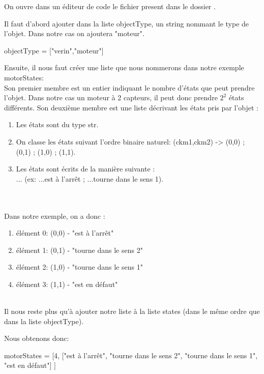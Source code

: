 \documentclass[12pt]{report}    %
\begin{document}
On ouvre dans un éditeur de code le fichier  present dans le dossier .


Il faut d'abord ajouter dans la liste objectType, un string nommant le type de l'objet. Dans notre cas on ajoutera "moteur". 
\begin{pyCode}
        objectType = ["verin","moteur"]
\end{pyCode}


Ensuite, il nous faut créer une liste que nous nommerons dans notre exemple motorStates:\\

Son premier membre est un entier indiquant le nombre d'états que peut prendre l'objet. Dans notre cas un moteur à 2 capteurs, il peut donc prendre $ 2^2 $ états différents.
Son deuxième membre est une liste décrivant les états pris par l'objet :

\begin{enumerate}
    \item Les états sont du type str.
    \item On classe les états suivant l'ordre binaire naturel: (ckm1,ckm2) -> (0,0) ; (0,1) ; (1,0) ; (1,1).
    \item Les états sont écrits de la manière suivante : \\
     ... (ex: ...est à l'arrêt ; ...tourne dans le sens 1).
\end{enumerate}\\ \\

Dans notre exemple, on a donc : 

\begin{enumerate}
    \item élément 0: (0,0) - "est à l'arrêt"
    \item élément 1: (0,1) - "tourne dans le sens 2"
    \item élément 2: (1,0) - "tourne dans le sens 1"
    \item élément 3: (1,1) - "est en défaut"
\end{enumerate}\\

Il nous reste plus qu'à ajouter notre liste à la liste states (dans le même ordre que dans la liste objectType).

Nous obtenons donc:

\begin{pyCode}
    motorStates = [4, ["est à l'arrêt", "tourne dans le sens 2", "tourne dans le sens 1", "est en défaut"] ]
\end{pyCode}
\end{document}
